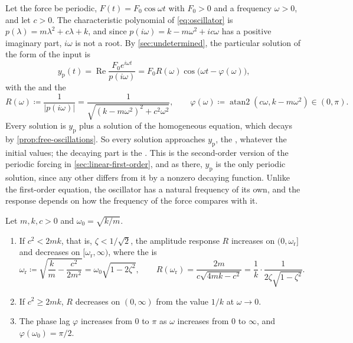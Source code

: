 Let the force be periodic, $F(t)=F_0\cos\omega t$ with $F_0>0$ and a frequency $\omega>0$, and let $c>0$. The characteristic polynomial of \eqref{eq:oscillator} is $p(\lambda)=m\lambda^2+c\lambda+k$, and since $p(i\omega)=k-m\omega^2+ic\omega$ has a positive imaginary part, $i\omega$ is not a root. By \cref{sec:undetermined}, the particular solution of the form of the input is
\begin{equation}
y_{\mathrm p}(t)=\operatorname{Re}\frac{F_0e^{i\omega t}}{p(i\omega)}=F_0R(\omega)\cos\bigl(\omega t-\varphi(\omega)\bigr),
\label{eq:steady-state}
\end{equation}
with the  and the 
\[
R(\omega)\coloneqq\frac1{|p(i\omega)|}=\frac1{\sqrt{(k-m\omega^2)^2+c^2\omega^2}},\qquad\varphi(\omega)\coloneqq\operatorname{atan2}(c\omega,k-m\omega^2)\in(0,\pi) .
\]
Every solution is $y_{\mathrm p}$ plus a solution of the homogeneous equation, which decays by \cref{prop:free-oscillations}. So every solution approaches $y_{\mathrm p}$, the , whatever the initial values; the decaying part is the . This is the second-order version of the periodic forcing in \cref{sec:linear-first-order}, and as there, $y_{\mathrm p}$ is the only periodic solution, since any other differs from it by a nonzero decaying function. Unlike the first-order equation, the oscillator has a natural frequency of its own, and the response depends on how the frequency of the force compares with it.

\begin{theorem}
\label{thm:frequency-response}
Let $m,k,c>0$ and $\omega_0=\sqrt{k/m}$.
\begin{enumerate}
\item If $c^2<2mk$, that is, $\zeta<1/\sqrt2$, the amplitude response $R$ increases on $(0,\omega_{\mathrm r}]$ and decreases on $[\omega_{\mathrm r},\infty)$, where the  is
\[
\omega_{\mathrm r}\coloneqq\sqrt{\frac km-\frac{c^2}{2m^2}}=\omega_0\sqrt{1-2\zeta^2},\qquad R(\omega_{\mathrm r})=\frac{2m}{c\sqrt{4mk-c^2}}=\frac1{k}\cdot\frac1{2\zeta\sqrt{1-\zeta^2}} .
\]
\item If $c^2\ge2mk$, $R$ decreases on $(0,\infty)$ from the value $1/k$ at $\omega\to0$.
\item The phase lag $\varphi$ increases from $0$ to $\pi$ as $\omega$ increases from $0$ to $\infty$, and $\varphi(\omega_0)=\pi/2$.
\end{enumerate}
\end{theorem}

